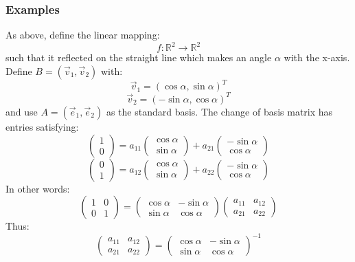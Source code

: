 \documentclass{exam}
\begin{document}
\subsubsection{Examples}

As above, define the linear mapping:
\[
f : \mathbb{R}^2 \to \mathbb{R}^2
\]
such that it reflected on the straight line which makes an angle $\alpha$ with the x-axis. Define $B = (\vec{v}_1, \vec{v}_2)$ with:
\[
\vec{v}_1 = (\cos \alpha, \sin \alpha)^T
\]
\[
\vec{v}_2 = (-\sin \alpha, \cos \alpha)^T
\]
and use $A = (\vec{e}_1, \vec{e}_2)$ as the standard basis.
The change of basis matrix has entries satisfying:
\[
\begin{pmatrix}
1 \\
0
\end{pmatrix}
= a_{11}
\begin{pmatrix}
\cos\alpha \\
\sin \alpha
\end{pmatrix}
+
a_{21}
\begin{pmatrix}
-\sin\alpha \\
\cos \alpha
\end{pmatrix}
\]
\[
\begin{pmatrix}
0 \\
1
\end{pmatrix}
= a_{12}
\begin{pmatrix}
\cos\alpha \\
\sin \alpha
\end{pmatrix}
+
a_{22}
\begin{pmatrix}
-\sin\alpha \\
\cos \alpha
\end{pmatrix}
\]
In other words:
\[
\begin{pmatrix}
1 & 0 \\
0 & 1
\end{pmatrix}
= 
\begin{pmatrix}
\cos \alpha & -\sin \alpha \\
\sin \alpha & \cos \alpha
\end{pmatrix}
\begin{pmatrix}
a_{11} & a_{12} \\
a_{21} & a_{22}
\end{pmatrix}
\]
Thus:
\[
\begin{pmatrix}
a_{11} & a_{12} \\
a_{21} & a_{22}
\end{pmatrix}
= 
\begin{pmatrix}
\cos \alpha & -\sin \alpha \\
\sin \alpha & \cos \alpha
\end{pmatrix}^{-1}
\]
\end{document}
